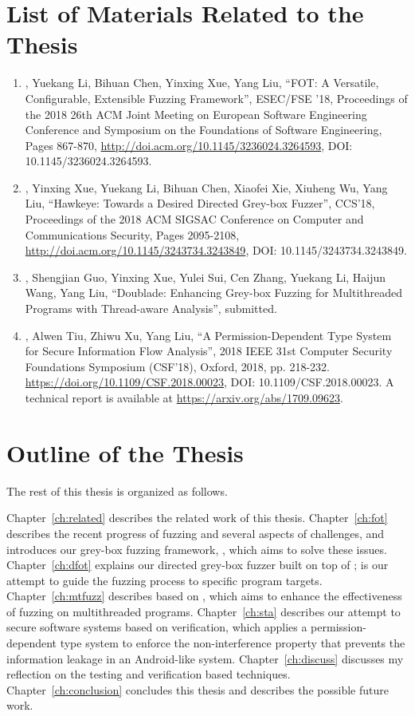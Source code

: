 \section{List of Materials Related to the Thesis}
\begin{enumerate}
	\item \myname, Yuekang Li, Bihuan Chen, Yinxing Xue, Yang Liu, ``FOT: A Versatile, Configurable, Extensible Fuzzing Framework'', ESEC/FSE '18, Proceedings of the 2018 26th ACM Joint Meeting on European Software Engineering Conference and Symposium on the Foundations of Software Engineering, Pages 867-870, \url{http://doi.acm.org/10.1145/3236024.3264593}, DOI: 10.1145/3236024.3264593.
	\item \myname, Yinxing Xue, Yuekang Li, Bihuan Chen, Xiaofei Xie, Xiuheng Wu, Yang Liu, ``Hawkeye: Towards a Desired Directed Grey-box Fuzzer'', CCS'18, Proceedings of the 2018 ACM SIGSAC Conference on Computer and Communications Security, Pages 2095-2108, \url{http://doi.acm.org/10.1145/3243734.3243849}, DOI: 10.1145/3243734.3243849.
	\item \myname, Shengjian Guo, Yinxing Xue, Yulei Sui, Cen Zhang, Yuekang Li, Haijun Wang, Yang Liu, ``Doublade: Enhancing Grey-box Fuzzing for Multithreaded Programs with Thread-aware Analysis'', submitted.
	\item \myname, Alwen Tiu, Zhiwu Xu, Yang Liu, ``A Permission-Dependent Type System for Secure Information Flow Analysis'', 2018 IEEE 31st Computer Security Foundations Symposium (CSF'18), Oxford, 2018, pp. 218-232. \url{https://doi.org/10.1109/CSF.2018.00023}, DOI: 10.1109/CSF.2018.00023. A technical report is available at \url{https://arxiv.org/abs/1709.09623}.
\end{enumerate}

\section{Outline of the Thesis}

The rest of this thesis is organized as follows.

Chapter~\ref{ch:related} describes the related work of this thesis. Chapter~\ref{ch:fot} describes the recent progress of fuzzing and several aspects of challenges, and introduces our grey-box fuzzing framework, \FOT, which aims to solve these issues. Chapter~\ref{ch:dfot} explains our directed grey-box fuzzer \dFOT built on top of \FOT; \dFOT is our attempt to guide the fuzzing process to specific program targets. Chapter~\ref{ch:mtfuzz} describes \mtfuzz based on \FOT, which aims to enhance the effectiveness of fuzzing on multithreaded programs. Chapter~\ref{ch:sta} describes our attempt to secure software systems based on verification, which applies a permission-dependent type system to enforce the non-interference property that prevents the information leakage in an Android-like system. Chapter~\ref{ch:discuss} discusses my reflection on the testing and verification based techniques. Chapter~\ref{ch:conclusion} concludes this thesis and describes the possible future work.